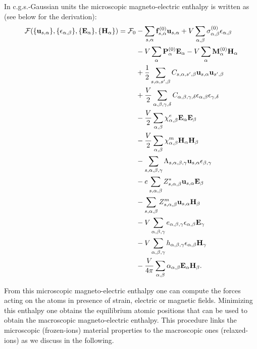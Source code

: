 \documentclass[12pt,a4paper,twoside]{report}
\begin{document}
\newpage
{\color{orange} In c.g.s.-Gaussian units the microscopic
magneto-electric enthalpy is written as (see below for the derivation):
\begin{align}
\mathcal{F}(\{{\bf u}_{s,\alpha}\}, \{\epsilon_{\alpha,\beta}\},
\{ {\bf E}_\alpha\}, \{{\bf H}_\alpha\})=\mathcal{F}_0 &-
\sum_{s,\alpha} {\bf f}^{(0)}_{s,\alpha} {\bf u}_{s,\alpha}+ 
V \sum_{\alpha,\beta}
\sigma^{(0)}_{\alpha,\beta} \epsilon_{\alpha,\beta} \nonumber \\ 
&- V \sum_{\alpha} {\bf P}^{(0)}_\alpha {\bf E}_\alpha - 
V \sum_{\alpha}
{\bf M}^{(0)}_\alpha {\bf H}_\alpha \nonumber \\
&+ {1\over 2}
\sum_{s,\alpha,s',\beta} C_{s,\alpha,s',\beta} {\bf u}_{s,\alpha}
{\bf u}_{s',\beta}\nonumber \\
&+ {V\over 2}\sum_{\alpha,\beta,\gamma,\delta} 
C_{\alpha,\beta,\gamma,\delta}  
\epsilon_{\alpha,\beta}
\epsilon_{\gamma,\delta} \nonumber \\
&- {V\over 2} \sum_{\alpha,\beta} 
\chi^e_{\alpha,\beta}
{\bf E}_{\alpha}
{\bf E}_{\beta} \nonumber \\
&- {V \over 2}  \sum_{\alpha,\beta} 
\chi^m_{\alpha,\beta}
{\bf H}_{\alpha}
{\bf H}_{\beta} \nonumber \\
&- \sum_{s,\alpha,\beta,\gamma}
\Lambda_{s,\alpha,\beta,\gamma} {\bf u}_{s,\alpha}
\epsilon_{\beta,\gamma}\nonumber \\
&- e\sum_{s,\alpha,\beta} Z^*_{s,\alpha,\beta} 
{\bf u}_{s,\alpha} {\bf E}_{\beta} \nonumber \\
&- \sum_{s,\alpha,\beta} 
Z^m_{s,\alpha,\beta} {\bf u}_{s,\alpha}{\bf H}_{\beta} \nonumber \\
&- V \sum_{\alpha,\beta,\gamma} e_{\alpha,\beta,\gamma} 
\epsilon_{\alpha,\beta} {\bf E}_{\gamma} \nonumber \\
&- V \sum_{\alpha,\beta,\gamma}  h_{\alpha,\beta,\gamma} 
\epsilon_{\alpha,\beta} {\bf H}_{\gamma} \nonumber \\
&- {V \over 4 \pi} \sum_{\alpha,\beta} 
\alpha_{\alpha,\beta} {\bf E}_{\alpha}
{\bf H}_{\beta}.
\end{align}
}

\newpage
From this microscopic magneto-electric enthalpy one can compute the forces
acting on the atoms in presence of strain, electric or magnetic fields. 
Minimizing this
enthalpy one obtains the equilibrium atomic positions that can be used
to obtain the macroscopic magneto-electric enthalpy. This procedure
links the microscopic (frozen-ions) material properties to the
macroscopic ones (relaxed-ions) as we discuss in the following. 
\end{document}
